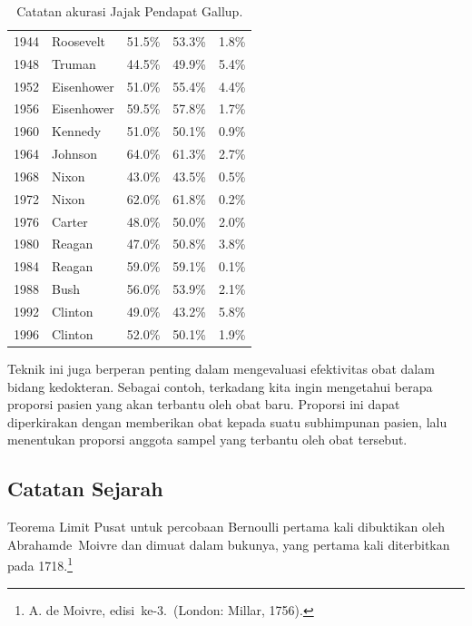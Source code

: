 \begin{example}
\begin{table}
\begin{tabular}{clccc}
1944 & Roosevelt  & 51.5\% & 53.3\% & 1.8\%\\
1948 & Truman     & 44.5\% & 49.9\% & 5.4\%\\
1952 & Eisenhower & 51.0\% & 55.4\% & 4.4\%\\
1956 & Eisenhower & 59.5\% & 57.8\% & 1.7\%\\
1960 & Kennedy    & 51.0\% & 50.1\% & 0.9\%\\
1964 & Johnson    & 64.0\% & 61.3\% & 2.7\%\\
1968 & Nixon      & 43.0\% & 43.5\% & 0.5\%\\
1972 & Nixon      & 62.0\% & 61.8\% & 0.2\%\\
1976 & Carter     & 48.0\% & 50.0\% & 2.0\%\\
1980 & Reagan     & 47.0\% & 50.8\% & 3.8\%\\
1984 & Reagan     & 59.0\% & 59.1\% & 0.1\%\\
1988 & Bush       & 56.0\% & 53.9\% & 2.1\%\\
1992 & Clinton    & 49.0\% & 43.2\% & 5.8\%\\
1996 & Clinton    & 52.0\% & 50.1\% & 1.9\%\\
\end{tabular}
\caption{Catatan akurasi Jajak Pendapat Gallup.}
\label{table 9.1}
\end{table}
\par
Teknik ini juga berperan penting dalam mengevaluasi efektivitas obat dalam
bidang kedokteran.  Sebagai contoh, terkadang kita ingin mengetahui berapa proporsi pasien
yang akan terbantu oleh obat baru.  Proporsi ini dapat diperkirakan dengan memberikan obat kepada suatu subhimpunan
pasien, lalu menentukan proporsi anggota sampel yang terbantu oleh obat tersebut.
\end{example}



\subsection*{Catatan Sejarah}
Teorema Limit Pusat untuk percobaan Bernoulli pertama kali dibuktikan oleh Abraham\linebreak[4]
de~Moivre dan dimuat dalam bukunya,  yang pertama kali
diterbitkan pada 1718.\footnote{A. de Moivre,  edisi~ke-3.\ (London: Millar,
1756).}

